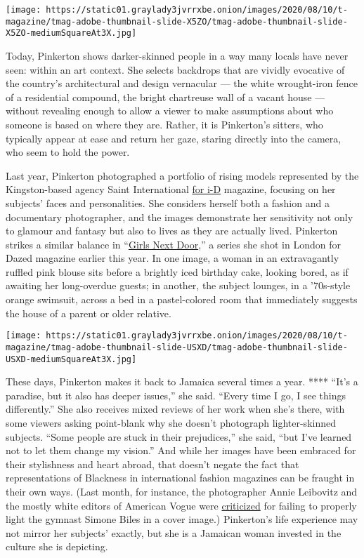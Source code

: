 \texttt{[image: https://static01.graylady3jvrrxbe.onion/images/2020/08/10/t-magazine/tmag-adobe-thumbnail-slide-X5ZO/tmag-adobe-thumbnail-slide-X5ZO-mediumSquareAt3X.jpg]}

Today, Pinkerton shows darker-skinned people in a way many locals have
never seen: within an art context. She selects backdrops that are
vividly evocative of the country's architectural and design vernacular
--- the white wrought-iron fence of a residential compound, the bright
chartreuse wall of a vacant house --- without revealing enough to allow
a viewer to make assumptions about who someone is based on where they
are. Rather, it is Pinkerton's sitters, who typically appear at ease and
return her gaze, staring directly into the camera, who seem to hold the
power.

Last year, Pinkerton photographed a portfolio of rising models
represented by the Kingston-based agency Saint International
\href{https://i-d.vice.com/en_uk/article/ne8mzd/saint-international-agency-amber-pinkerton-jamaican-models}{for
i-D} magazine, focusing on her subjects' faces and personalities. She
considers herself both a fashion and a documentary photographer, and the
images demonstrate her sensitivity not only to glamour and fantasy but
also to lives as they are actually lived. Pinkerton strikes a similar
balance in ``\href{https://www.instagram.com/p/B-w8tzeHKUw/}{Girls Next
Door},'' a series she shot in London for Dazed magazine earlier this
year. In one image, a woman in an extravagantly ruffled pink blouse sits
before a brightly iced birthday cake, looking bored, as if awaiting her
long-overdue guests; in another, the subject lounges, in a '70s-style
orange swimsuit, across a bed in a pastel-colored room that immediately
suggests the house of a parent or older relative.

\texttt{[image: https://static01.graylady3jvrrxbe.onion/images/2020/08/10/t-magazine/tmag-adobe-thumbnail-slide-USXD/tmag-adobe-thumbnail-slide-USXD-mediumSquareAt3X.jpg]}

These days, Pinkerton makes it back to Jamaica several times a year.
**** ``It's a paradise, but it also has deeper issues,'' she said.
``Every time I go, I see things differently.'' She also receives mixed
reviews of her work when she's there, with some viewers asking
point-blank why she doesn't photograph lighter-skinned subjects. ``Some
people are stuck in their prejudices,'' she said, ``but I've learned not
to let them change my vision.'' And while her images have been embraced
for their stylishness and heart abroad, that doesn't negate the fact
that representations of Blackness in international fashion magazines can
be fraught in their own ways. (Last month, for instance, the
photographer Annie Leibovitz and the mostly white editors of American
Vogue were
\href{https://www.huffpost.com/entry/simone-biles-vogue-black-photographers_n_5f09613ac5b6480493d05283?guccounter=1}{criticized}
for failing to properly light the gymnast Simone Biles in a cover
image.) Pinkerton's life experience may not mirror her subjects'
exactly, but she is a Jamaican woman invested in the culture she is
depicting.

